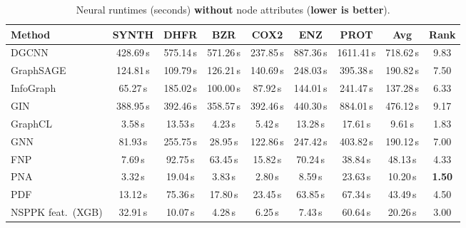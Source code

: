 \begin{table}[H]
\centering
\caption{Neural runtimes (seconds) \textbf{without} node attributes (\textbf{lower is better}).}
\label{tab:no_attr_runtime_nns}
\scriptsize
\setlength{\tabcolsep}{3.5pt}
\begin{adjustbox}{max width=\textwidth}
\begin{tabular}{lcccccccc}
\toprule
\textbf{Method} & \textbf{SYNTH} & \textbf{DHFR} & \textbf{BZR} & \textbf{COX2} & \textbf{ENZ} & \textbf{PROT} & \textbf{Avg} & \textbf{Rank}\\
\midrule
DGCNN & 428.69\,s & 575.14\,s & 571.26\,s & 237.85\,s & 887.36\,s & 1611.41\,s & 718.62\,s & 9.83\\
GraphSAGE & 124.81\,s & 109.79\,s & 126.21\,s & 140.69\,s & 248.03\,s & 395.38\,s & 190.82\,s & 7.50\\
InfoGraph & 65.27\,s & 185.02\,s & 100.00\,s & 87.92\,s & 144.01\,s & 241.47\,s & 137.28\,s & 6.33\\
GIN & 388.95\,s & 392.46\,s & 358.57\,s & 392.46\,s & 440.30\,s & 884.01\,s & 476.12\,s & 9.17\\
GraphCL & 3.58\,s & 13.53\,s & 4.23\,s & 5.42\,s & 13.28\,s & 17.61\,s & 9.61\,s & 1.83\\
GNN & 81.93\,s & 255.75\,s & 28.95\,s & 122.86\,s & 247.42\,s & 403.82\,s & 190.12\,s & 7.00\\
FNP & 7.69\,s & 92.75\,s & 63.45\,s & 15.82\,s & 70.24\,s & 38.84\,s & 48.13\,s & 4.33\\
PNA & 3.32\,s & 19.04\,s & 3.83\,s & 2.80\,s & 8.59\,s & 23.63\,s & 10.20\,s & \textbf{1.50}\\
PDF & 13.12\,s & 75.36\,s & 17.80\,s & 23.45\,s & 63.85\,s & 67.34\,s & 43.49\,s & 4.50\\
NSPPK feat.\ (XGB) & 32.91\,s & 10.07\,s & 4.28\,s & 6.25\,s & 7.43\,s & 60.64\,s & 20.26\,s & 3.00\\
\bottomrule
\end{tabular}
\end{adjustbox}
\end{table}
